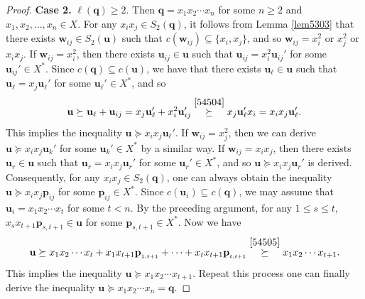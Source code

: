 \documentclass[reqno]{amsart}
\theoremstyle{plain}
\theoremstyle{definition}
\newcommand{\bp}{\mathbf{p}}
\newcommand{\bq}{\mathbf{q}}
\newcommand{\bu}{\mathbf{u}}
\newcommand{\bw}{\mathbf{w}}
\begin{document}
\begin{proof}
\textbf{Case 2.} $\ell(\bq)\geq2$.
Then $\bq=x_1x_2\cdots x_n$ for some $n\geq 2$ and $x_1, x_2, \ldots, x_n \in X$.
For any $x_ix_j\in S_2(\bq)$, it follows from Lemma \ref{lem5303} that
there exists $\bw_{ij}\in S_2(\bu)$ such that $c(\bw_{ij})\subseteq \{x_i, x_j\}$, and so $\bw_{ij}=x_i^2$ or $x_j^2$ or $x_ix_j$.
If $\bw_{ij}=x_i^2$, then there exists $\bu_{ij} \in \bu$ such that
$\bu_{ij}=x_i^2\bu_{ij}'$ for some $\bu_{ij}'\in X^*$.
Since $c(\bq)\subseteq c(\bu)$, we have that there exists $\bu_\ell \in \bu$ such that $\bu_\ell=x_j\bu_\ell'$ for some $\bu_\ell'\in X^*$,
and so
\[
\bu \succeq \bu_\ell+\bu_{ij}=x_j\bu_\ell'+x_i^2\bu_{ij}'
\stackrel{\eqref{54504}}\succeq x_j\bu_\ell'x_i=x_ix_j\bu_\ell'.
\]
This implies the inequality $\bu\succeq x_ix_j\bu_\ell'$.
If $\bw_{ij}=x_j^2$, then we can derive $\bu \succeq x_ix_j\bu_k'$ for some $\bu_k'\in X^*$ by a similar way.
If $\bw_{ij}=x_ix_j$, then there exists $\bu_r\in \bu$ such that $\bu_r=x_ix_j\bu_r'$ for some $\bu_r'\in X^*$,
and so $\bu \succeq x_ix_j\bu_r'$ is derived.
Consequently, for any $x_ix_j\in S_2(\bq)$, one can always obtain the inequality
$\bu\succeq x_ix_j\bp_{ij}$ for some $\bp_{ij}\in X^*$.
Since $c(\bu_i)\subseteq c(\bq)$, we may assume that $\bu_i=x_1x_2\cdots x_t$ for some $t<n$.
By the preceding argument, for any $1\leq s\leq t$,
$x_sx_{t+1}\bp_{s, t+1}\in\bu$ for some $\bp_{s, t+1}\in X^*$.
Now we have
\[
\bu\succeq x_1x_2\cdots x_t+x_1x_{t+1}\bp_{_{1,t+1}}+\cdots+x_tx_{t+1}\bp_{_{t,t+1}}\stackrel{\eqref{54505}}\succeq x_1x_2\cdots x_{t+1}.
\]
This implies the inequality $\bu\succeq x_1x_2\cdots x_{t+1}$.
Repeat this process one can finally derive the inequality $\bu \succeq x_1x_2\cdots x_n=\bq$.
\end{proof}
\end{document}
